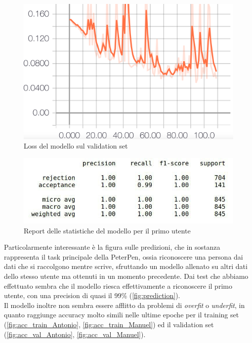 \documentclass[8pt,notitlepage]{report}
\begin{document}
			\begin{figure}[H]
				\begin{center}
					\includegraphics[scale=.16]{val_loss_Manuel}
					\caption{Loss del modello sul validation set}
				\end{center}
			\end{figure}
			
			\newpage			
			
			\begin{figure}[H]
				\begin{center}
					\includegraphics[scale=.4]{measures_table_LSTM}
					\caption{Report delle statistiche del modello per il primo utente}
				\end{center}
			\end{figure}
			\newpage
			Particolarmente interessante è la figura sulle predizioni, che in sostanza rappresenta il task principale della PeterPen, ossia riconoscere una persona dai dati che si raccolgono mentre scrive, sfruttando un modello allenato su altri dati dello stesso utente ma ottenuti in un momento precedente. Dai test che abbiamo effettuato sembra che il modello riesca effettivamente a riconoscere il primo utente, con una precision di quasi il 99\% (\cref{fig:prediction}). \\
			Il modello inoltre non sembra essere afflitto da problemi di \textit{overfit} o \textit{underfit}, in quanto raggiunge accuracy molto simili nelle ultime epoche per il training set (\cref{fig:acc_train_Antonio}, \cref{fig:acc_train_Manuel}) ed il validation set (\cref{fig:acc_val_Antonio}, \cref{fig:acc_val_Manuel}). \\
\end{document}
